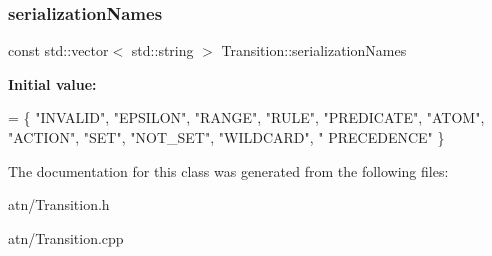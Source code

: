 \subsubsection{\texorpdfstring{serialization\+Names}{serializationNames}}
{\footnotesize\ttfamily const std\+::vector$<$ std\+::string $>$ Transition\+::serialization\+Names\hspace{0.3cm}{\ttfamily [static]}}

{\bfseries Initial value\+:}
\begin{DoxyCode}
= \{
  \textcolor{stringliteral}{"INVALID"}, \textcolor{stringliteral}{"EPSILON"}, \textcolor{stringliteral}{"RANGE"}, \textcolor{stringliteral}{"RULE"}, \textcolor{stringliteral}{"PREDICATE"}, \textcolor{stringliteral}{"ATOM"}, \textcolor{stringliteral}{"ACTION"}, \textcolor{stringliteral}{"SET"}, \textcolor{stringliteral}{"NOT\_SET"}, \textcolor{stringliteral}{"WILDCARD"}, \textcolor{stringliteral}{"
      PRECEDENCE"}
\}
\end{DoxyCode}


The documentation for this class was generated from the following files\+:\begin{DoxyCompactItemize}
\item 
atn/Transition.\+h\item 
atn/Transition.\+cpp\end{DoxyCompactItemize}
